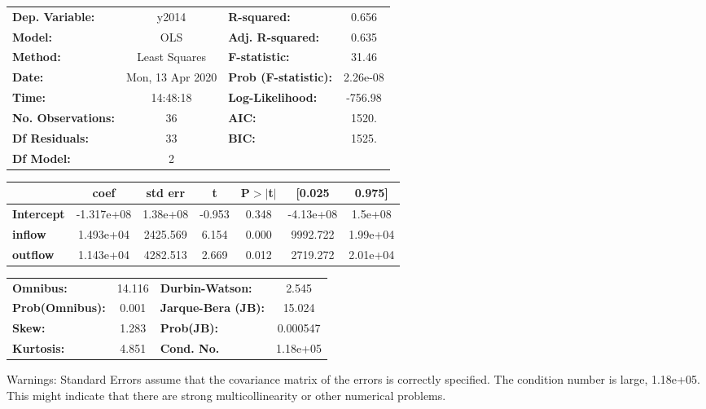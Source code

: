 \begin{center}
\begin{tabular}{lclc}
\toprule
\textbf{Dep. Variable:}    &      y2014       & \textbf{  R-squared:         } &     0.656   \\
\textbf{Model:}            &       OLS        & \textbf{  Adj. R-squared:    } &     0.635   \\
\textbf{Method:}           &  Least Squares   & \textbf{  F-statistic:       } &     31.46   \\
\textbf{Date:}             & Mon, 13 Apr 2020 & \textbf{  Prob (F-statistic):} &  2.26e-08   \\
\textbf{Time:}             &     14:48:18     & \textbf{  Log-Likelihood:    } &   -756.98   \\
\textbf{No. Observations:} &          36      & \textbf{  AIC:               } &     1520.   \\
\textbf{Df Residuals:}     &          33      & \textbf{  BIC:               } &     1525.   \\
\textbf{Df Model:}         &           2      & \textbf{                     } &             \\
\bottomrule
\end{tabular}
\begin{tabular}{lcccccc}
                   & \textbf{coef} & \textbf{std err} & \textbf{t} & \textbf{P$> |$t$|$} & \textbf{[0.025} & \textbf{0.975]}  \\
\midrule
\textbf{Intercept} &   -1.317e+08  &     1.38e+08     &    -0.953  &         0.348        &    -4.13e+08    &      1.5e+08     \\
\textbf{inflow}    &    1.493e+04  &     2425.569     &     6.154  &         0.000        &     9992.722    &     1.99e+04     \\
\textbf{outflow}   &    1.143e+04  &     4282.513     &     2.669  &         0.012        &     2719.272    &     2.01e+04     \\
\bottomrule
\end{tabular}
\begin{tabular}{lclc}
\textbf{Omnibus:}       & 14.116 & \textbf{  Durbin-Watson:     } &    2.545  \\
\textbf{Prob(Omnibus):} &  0.001 & \textbf{  Jarque-Bera (JB):  } &   15.024  \\
\textbf{Skew:}          &  1.283 & \textbf{  Prob(JB):          } & 0.000547  \\
\textbf{Kurtosis:}      &  4.851 & \textbf{  Cond. No.          } & 1.18e+05  \\
\bottomrule
\end{tabular}
\end{center}

Warnings: \newline
 [1] Standard Errors assume that the covariance matrix of the errors is correctly specified. \newline
 [2] The condition number is large, 1.18e+05. This might indicate that there are \newline
 strong multicollinearity or other numerical problems.